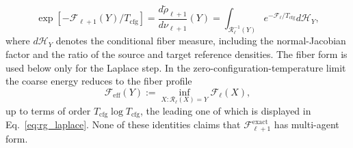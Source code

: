 \begin{equation}
\exp[-\mathcal{F}_{\ell+1}(Y)/T_{\mathrm{cfg}}] = \frac{d\widetilde{\rho}_{\ell+1}}{d\nu_{\ell+1}}(Y) = \int_{\mathcal{R}_\ell^{-1}(Y)} e^{-\mathcal{F}_\ell/T_{\mathrm{cfg}}}d\mathcal{H}_Y,
\label{eq:rg_exact_free_energy}
\end{equation}
where $d\mathcal{H}_Y$ denotes the conditional fiber measure, including the normal-Jacobian factor and the ratio of the source and target reference densities. The fiber form is used below only for the Laplace step. In the zero-configuration-temperature limit the coarse energy reduces to the fiber profile
\begin{equation}
\mathcal{F}_{\mathrm{eff}}(Y) := \inf_{X : \mathcal{R}_\ell(X) = Y} \mathcal{F}_\ell(X),
\label{eq:rg_zero_temperature_profile}
\end{equation}
up to terms of order $T_{\mathrm{cfg}}\log T_{\mathrm{cfg}}$, the leading one of which is displayed in Eq.~\eqref{eq:rg_laplace}. None of these identities claims that $\mathcal{F}^{\mathrm{exact}}_{\ell+1}$ has multi-agent form.


